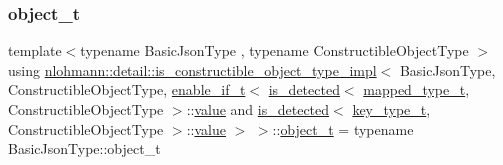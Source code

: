 \subsubsection{\texorpdfstring{object\_t}{object\_t}}
{\footnotesize\ttfamily template$<$typename Basic\+Json\+Type , typename Constructible\+Object\+Type $>$ \\
using \mbox{\hyperlink{structnlohmann_1_1detail_1_1is__constructible__object__type__impl}{nlohmann\+::detail\+::is\+\_\+constructible\+\_\+object\+\_\+type\+\_\+impl}}$<$ Basic\+Json\+Type, Constructible\+Object\+Type, \mbox{\hyperlink{namespacenlohmann_1_1detail_a02bcbc878bee413f25b985ada771aa9c}{enable\+\_\+if\+\_\+t}}$<$ \mbox{\hyperlink{namespacenlohmann_1_1detail_a9135fcf616d6ac6e231a86e0a055ac44}{is\+\_\+detected}}$<$ \mbox{\hyperlink{namespacenlohmann_1_1detail_a9c1795c148875722f8482d39e0eb9364}{mapped\+\_\+type\+\_\+t}}, Constructible\+Object\+Type $>$\+::\mbox{\hyperlink{structnlohmann_1_1detail_1_1is__constructible__object__type__impl_3_01_basic_json_type_00_01_con6e3270de8050717120afcafe87648413_a7c1801a302b938e3176435b6451962e4}{value}} and \mbox{\hyperlink{namespacenlohmann_1_1detail_a9135fcf616d6ac6e231a86e0a055ac44}{is\+\_\+detected}}$<$ \mbox{\hyperlink{namespacenlohmann_1_1detail_a66dfe39f03b05d6b7265a0ff748d64ef}{key\+\_\+type\+\_\+t}}, Constructible\+Object\+Type $>$\+::\mbox{\hyperlink{structnlohmann_1_1detail_1_1is__constructible__object__type__impl_3_01_basic_json_type_00_01_con6e3270de8050717120afcafe87648413_a7c1801a302b938e3176435b6451962e4}{value}} $>$ $>$\+::\mbox{\hyperlink{structnlohmann_1_1detail_1_1is__constructible__object__type__impl_3_01_basic_json_type_00_01_con6e3270de8050717120afcafe87648413_a6f458a63276ef62d60f4b93de03aa020}{object\+\_\+t}} =  typename Basic\+Json\+Type\+::object\+\_\+t}



